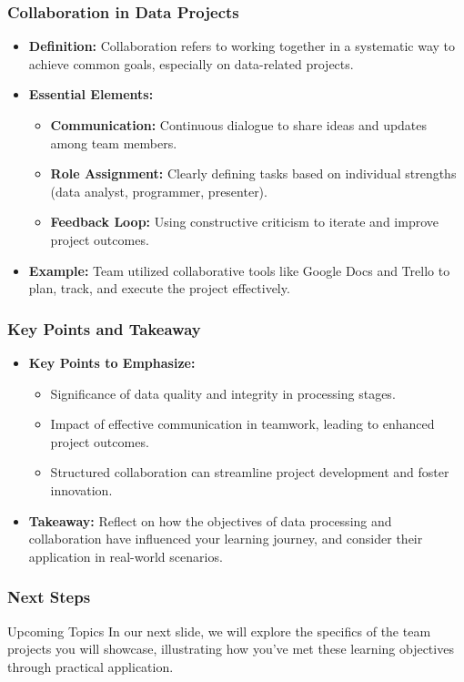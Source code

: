 \documentclass[aspectratio=169]{beamer}
\begin{document}
\begin{frame}[fragile]
    \frametitle{Collaboration in Data Projects}
    \begin{itemize}
        \item \textbf{Definition:} Collaboration refers to working together in a systematic way to achieve common goals, especially on data-related projects.
        \item \textbf{Essential Elements:}
        \begin{itemize}
            \item \textbf{Communication:} Continuous dialogue to share ideas and updates among team members.
            \item \textbf{Role Assignment:} Clearly defining tasks based on individual strengths (data analyst, programmer, presenter).
            \item \textbf{Feedback Loop:} Using constructive criticism to iterate and improve project outcomes.
        \end{itemize}
        \item \textbf{Example:} Team utilized collaborative tools like Google Docs and Trello to plan, track, and execute the project effectively.
    \end{itemize}
\end{frame}

\begin{frame}[fragile]
    \frametitle{Key Points and Takeaway}
    \begin{itemize}
        \item \textbf{Key Points to Emphasize:}
        \begin{itemize}
            \item Significance of data quality and integrity in processing stages.
            \item Impact of effective communication in teamwork, leading to enhanced project outcomes.
            \item Structured collaboration can streamline project development and foster innovation.
        \end{itemize}
        \item \textbf{Takeaway:} Reflect on how the objectives of data processing and collaboration have influenced your learning journey, and consider their application in real-world scenarios.
    \end{itemize}
\end{frame}

\begin{frame}[fragile]
    \frametitle{Next Steps}
    \begin{block}{Upcoming Topics}
        In our next slide, we will explore the specifics of the team projects you will showcase, illustrating how you’ve met these learning objectives through practical application.
    \end{block}
\end{frame}
\end{document}

